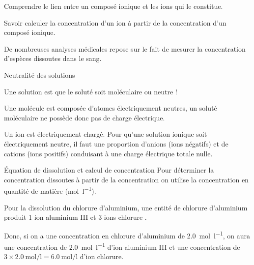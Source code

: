 \teteTermStssDosa
{}

\begin{objectifs}
  \item Comprendre le lien entre un composé ionique et les ions qui le constitue.
  \item Savoir calculer la concentration d'un ion à partir de la concentration d'un composé ionique.
\end{objectifs}

\begin{contexte}
  De nombreuses analyses médicales repose sur le fait de mesurer la concentration d'espèces dissoutes dans le sang.
  
\end{contexte}


\begin{doc}{Neutralité des solutions}
  \begin{figure}
    \vspace*{-18pt}
  \end{figure}
  Une solution est  que le soluté soit moléculaire ou neutre !

  Une molécule est composée d'atomes électriquement neutres, un soluté moléculaire ne possède donc pas de charge électrique.
  
  Un ion est électriquement chargé. Pour qu'une solution ionique soit électriquement neutre, il faut une proportion d'anions (ions négatifs) et de cations (ions positifs) conduisant à une charge électrique totale nulle.

\end{doc}

\begin{doc}{Équation de dissolution et calcul de concentration}
  Pour déterminer la concentration  dissoutes à partir de la concentration  on utilise la concentration en quantité de matière (\unit{\mole\per\litre}).
  \medskip

  \exemple Pour la dissolution du chlorure d'aluminium, une entité de chlorure d'aluminium  produit 1 ion aluminium III  et 3 ions chlorure \chlorure.

  Donc, si on a une concentration en chlorure d'aluminium de \qty{2,0}{\mole\per\litre}, on aura une concentration de \qty{2,0}{\mole\per\litre} d'ion aluminium III et une concentration de $3\times\qty{2,0}{\mole\per\litre} = \qty{6,0}{\mole\per\litre}$ d'ion chlorure.
\end{doc}

